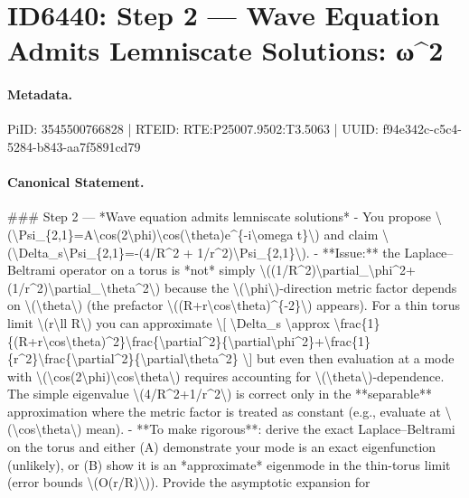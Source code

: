 \section*{ID6440: Step 2 — Wave Equation Admits Lemniscate Solutions: ω\textasciicircum{}2}
\paragraph{Metadata.}
PiID: 3545500766828 | RTEID: RTE:P25007.9502:T3.5063 | UUID: f94e342c-c5c4-5284-b843-aa7f5891cd79

\paragraph{Canonical Statement.}
\#\#\# Step 2 — *Wave equation admits lemniscate solutions* - You propose \textbackslash{}(\textbackslash{}Psi\_\{2,1\}=A\textbackslash{}cos(2\textbackslash{}phi)\textbackslash{}cos(\textbackslash{}theta)e\textasciicircum{}\{-i\textbackslash{}omega t\}\textbackslash{}) and claim \textbackslash{}(\textbackslash{}Delta\_s\textbackslash{}Psi\_\{2,1\}=-(4/R\textasciicircum{}2 + 1/r\textasciicircum{}2)\textbackslash{}Psi\_\{2,1\}\textbackslash{}). - **Issue:** the Laplace–Beltrami operator on a torus is *not* simply \textbackslash{}((1/R\textasciicircum{}2)\textbackslash{}partial\_\textbackslash{}phi\textasciicircum{}2+(1/r\textasciicircum{}2)\textbackslash{}partial\_\textbackslash{}theta\textasciicircum{}2\textbackslash{}) because the \textbackslash{}(\textbackslash{}phi\textbackslash{})-direction metric factor depends on \textbackslash{}(\textbackslash{}theta\textbackslash{}) (the prefactor \textbackslash{}((R+r\textbackslash{}cos\textbackslash{}theta)\textasciicircum{}\{-2\}\textbackslash{}) appears). For a thin torus limit \textbackslash{}(r\textbackslash{}ll R\textbackslash{}) you can approximate \textbackslash{}[ \textbackslash{}Delta\_s \textbackslash{}approx \textbackslash{}frac\{1\}\{(R+r\textbackslash{}cos\textbackslash{}theta)\textasciicircum{}2\}\textbackslash{}frac\{\textbackslash{}partial\textasciicircum{}2\}\{\textbackslash{}partial\textbackslash{}phi\textasciicircum{}2\}+\textbackslash{}frac\{1\}\{r\textasciicircum{}2\}\textbackslash{}frac\{\textbackslash{}partial\textasciicircum{}2\}\{\textbackslash{}partial\textbackslash{}theta\textasciicircum{}2\} \textbackslash{}] but even then evaluation at a mode with \textbackslash{}(\textbackslash{}cos(2\textbackslash{}phi)\textbackslash{}cos\textbackslash{}theta\textbackslash{}) requires accounting for \textbackslash{}(\textbackslash{}theta\textbackslash{})-dependence. The simple eigenvalue \textbackslash{}(4/R\textasciicircum{}2+1/r\textasciicircum{}2\textbackslash{}) is correct only in the **separable** approximation where the metric factor is treated as constant (e.g., evaluate at \textbackslash{}(\textbackslash{}cos\textbackslash{}theta\textbackslash{}) mean). - **To make rigorous**: derive the exact Laplace–Beltrami on the torus and either (A) demonstrate your mode is an exact eigenfunction (unlikely), or (B) show it is an *approximate* eigenmode in the thin-torus limit (error bounds \textbackslash{}(O(r/R)\textbackslash{})). Provide the asymptotic expansion for 